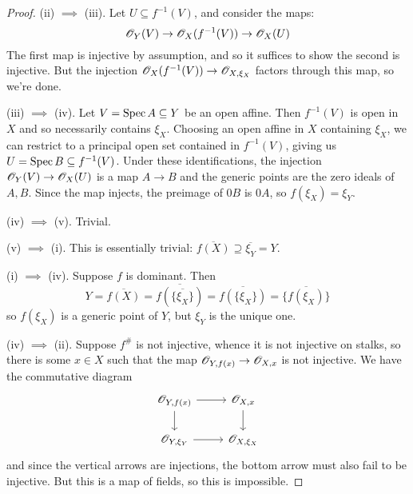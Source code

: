 \begin{proof}
	(ii) $\implies$ (iii). Let $U \subseteq f^{-1}(V)$, and consider the maps:
	\[ \mathscr{O}_Y(V) \to \mathscr{O}_X(f^{-1}(V)) \to \mathscr{O}_X(U) \]
	The first map is injective by assumption, and so it suffices to show the second is injective. But the injection $\mathscr{O}_X(f^{-1}(V)) \to \mathscr{O}_{X,\xi_X}$ factors through this map, so we're done.
	
	(iii) $\implies$ (iv). Let $V = \operatorname{Spec} A \subseteq Y$ be an open affine. Then $f^{-1}(V)$ is open in $X$ and so necessarily contains $\xi_X$. Choosing an open affine in $X$ containing $\xi_X$, we can restrict to a principal open set contained in $f^{-1}(V)$, giving us $U = \operatorname{Spec} B \subseteq f^{-1}(V)$. Under these identifications, the injection $\mathscr{O}_Y(V) \to \mathscr{O}_X(U)$ is a map $A \to B$ and the generic points are the zero ideals of $A,B$. Since the map injects, the preimage of $0B$ is $0A$, so $f(\xi_X) = \xi_Y$.
	
	(iv) $\implies$ (v). Trivial.
	
	(v) $\implies$ (i). This is essentially trivial: $\overline{f(X)} \supseteq \overline{\xi_Y} = Y$.
	
	(i) $\implies$ (iv). Suppose $f$ is dominant. Then
	\[ Y = \overline{f(X)} = \overline{f(\overline{\{\xi_X\}})} = \overline{f(\{\xi_X\})} = \overline{\{f(\xi_X)\}} \]
	so $f(\xi_X)$ is a generic point of $Y$, but $\xi_Y$ is the unique one.
	
	(iv) $\implies$ (ii). Suppose $f^\#$ is not injective, whence it is not injective on stalks, so there is some $x \in X$ such that the map $\mathscr{O}_{Y,f(x)} \to \mathscr{O}_{X,x}$ is not injective. We have the commutative diagram
	\[ \begin{tikzcd} \scO_{Y,f(x)} \arrow[r] \arrow[d] & \scO_{X,x} \arrow[d] \\ \scO_{Y,\xi_Y} \arrow[r] & \scO_{X,\xi_X} \end{tikzcd} \]
	and since the vertical arrows are injections, the bottom arrow must also fail to be injective. But this is a map of fields, so this is impossible.
\end{proof}
